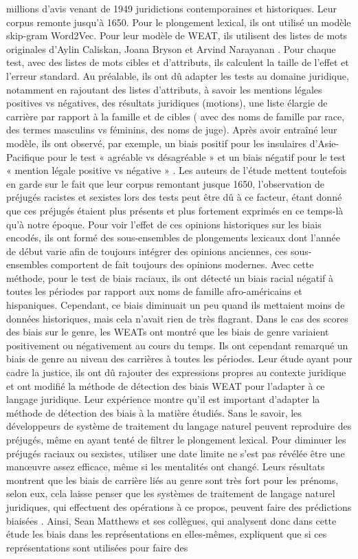 \documentclass{article}
\begin{document}
millions d’avis venant de 1949 juridictions contemporaines et historiques. Leur corpus remonte jusqu’à 1650. Pour le plongement lexical, ils ont utilisé un  modèle skip-gram Word2Vec. Pour leur modèle de WEAT, ils utilisent des listes de mots originales d’Aylin Caliskan, Joana Bryson et Arvind Narayanan \cite{caliskan2017semantics}. Pour chaque test, avec des listes de mots cibles et d’attributs, ils calculent la taille de l’effet et l’erreur standard. Au préalable, ils ont dû adapter les tests au domaine juridique, notamment en rajoutant des listes d’attributs, à savoir les mentions légales positives vs négatives, des résultats juridiques (motions), une liste élargie de carrière par rapport à la famille et de cibles ( avec des noms de famille par race, des termes masculins vs féminins, des noms de juge). Après avoir entraîné leur modèle, ils ont observé, par exemple, un biais positif pour les insulaires d’Asie-Pacifique pour le test « agréable vs désagréable » et un biais négatif pour le test « mention légale positive vs négative » \cite[p. 3]{matthews2022gender}. Les auteurs de l’étude mettent toutefois en garde sur le fait que leur corpus remontant jusque 1650, l’observation de préjugés racistes et sexistes lors des tests peut être dû à ce facteur, étant donné que ces préjugés étaient plus présents et plus fortement exprimés en ce temps-là qu’à notre époque. Pour voir l’effet de ces opinions historiques sur les biais encodés, ils ont formé des sous-ensembles de plongements lexicaux dont l’année de début varie afin de toujours intégrer des opinions anciennes, ces sous-ensembles comportent de fait toujours des opinions modernes. Avec cette méthode, pour le test de biais raciaux, ils ont détecté un biais racial négatif à toutes les périodes par rapport aux noms de famille afro-américains et hispaniques. Cependant, ce biais diminuait un peu quand ils mettaient moins de données historiques, mais cela n’avait rien de très flagrant. Dans le cas des scores des biais sur le genre, les WEATs ont montré que les biais de genre variaient positivement ou négativement au cours du temps. Ils ont cependant remarqué un biais de genre au niveau des carrières à toutes les périodes. Leur étude ayant pour cadre la justice, ils ont dû rajouter des expressions propres au contexte juridique et ont modifié la méthode de détection des biais WEAT pour l’adapter à ce langage juridique. Leur expérience montre qu’il est important d’adapter la méthode de détection des biais à la matière étudiés. Sans le savoir, les développeurs de système de traitement du langage naturel peuvent reproduire des préjugés, même en ayant tenté de filtrer le plongement lexical. Pour diminuer les préjugés raciaux ou sexistes, utiliser une date limite ne s’est pas révélée être une manœuvre assez efficace, même si les mentalités ont changé. Leurs résultats montrent que les biais de carrière liés au genre sont très fort pour les prénoms, selon eux, cela laisse penser que les systèmes de traitement de langage naturel juridiques, qui effectuent des opérations à ce propos, peuvent faire des prédictions biaisées \cite{matthews2022gender}. Ainsi, Sean Matthews et ses collègues, qui analysent donc dans cette étude les biais dans les représentations en elles-mêmes, expliquent que si ces représentations sont utilisées pour faire des 
\end{document}
